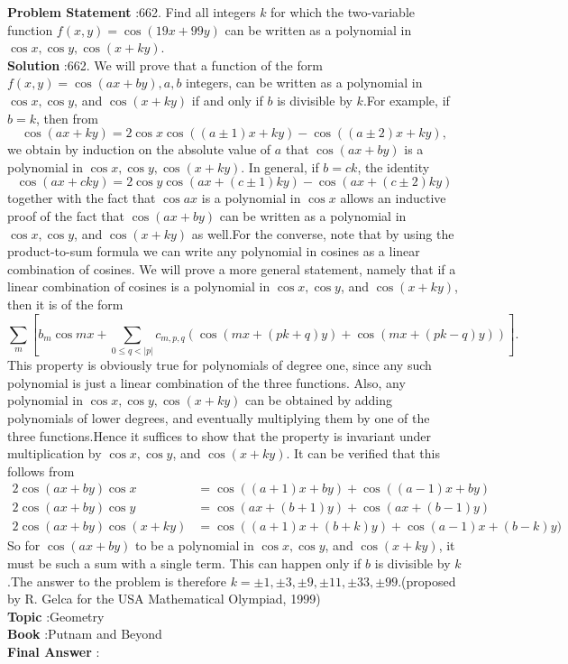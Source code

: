 \documentclass[10pt]{article}
\begin{document}
\textbf{Problem Statement} :662. Find all integers $k$ for which the two-variable function $f(x, y)=\cos (19 x+99 y)$ can be written as a polynomial in $\cos x, \cos y, \cos (x+k y)$.\\
\textbf{Solution} :662. We will prove that a function of the form $f(x, y)=\cos (a x+b y), a, b$ integers, can be written as a polynomial in $\cos x, \cos y$, and $\cos (x+k y)$ if and only if $b$ is divisible by $k$.For example, if $b=k$, then from$$ \cos (a x+k y)=2 \cos x \cos ((a \pm 1) x+k y)-\cos ((a \pm 2) x+k y), $$we obtain by induction on the absolute value of $a$ that $\cos (a x+b y)$ is a polynomial in $\cos x, \cos y, \cos (x+k y)$. In general, if $b=c k$, the identity$$ \cos (a x+c k y)=2 \cos y \cos (a x+(c \pm 1) k y)-\cos (a x+(c \pm 2) k y) $$together with the fact that $\cos a x$ is a polynomial in $\cos x$ allows an inductive proof of the fact that $\cos (a x+b y)$ can be written as a polynomial in $\cos x, \cos y$, and $\cos (x+k y)$ as well.For the converse, note that by using the product-to-sum formula we can write any polynomial in cosines as a linear combination of cosines. We will prove a more general statement, namely that if a linear combination of cosines is a polynomial in $\cos x, \cos y$, and $\cos (x+k y)$, then it is of the form$$ \sum_{m}\left[b_{m} \cos m x+\sum_{0 \leq q<|p|} c_{m, p, q}(\cos (m x+(p k+q) y)+\cos (m x+(p k-q) y))\right] \text {. } $$This property is obviously true for polynomials of degree one, since any such polynomial is just a linear combination of the three functions. Also, any polynomial in $\cos x, \cos y, \cos (x+k y)$ can be obtained by adding polynomials of lower degrees, and eventually multiplying them by one of the three functions.Hence it suffices to show that the property is invariant under multiplication by $\cos x, \cos y$, and $\cos (x+k y)$. It can be verified that this follows from$$ \begin{aligned} 2 \cos (a x+b y) \cos x &=\cos ((a+1) x+b y)+\cos ((a-1) x+b y) \\ 2 \cos (a x+b y) \cos y &=\cos (a x+(b+1) y)+\cos (a x+(b-1) y) \\ 2 \cos (a x+b y) \cos (x+k y) &=\cos ((a+1) x+(b+k) y)+\cos (a-1) x+(b-k) y) \end{aligned} $$So for $\cos (a x+b y)$ to be a polynomial in $\cos x, \cos y$, and $\cos (x+k y)$, it must be such a sum with a single term. This can happen only if $b$ is divisible by $k$.The answer to the problem is therefore $k=\pm 1, \pm 3, \pm 9, \pm 11, \pm 33, \pm 99$.(proposed by R. Gelca for the USA Mathematical Olympiad, 1999)\\
\textbf{Topic} :Geometry\\
\textbf{Book} :Putnam and Beyond\\
\textbf{Final Answer} :\\
\end{document}
